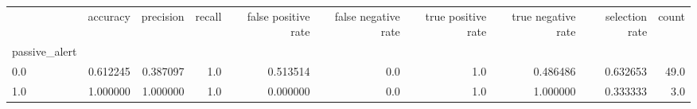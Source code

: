 \begin{tabular}{lrrrrrrrrr}
\toprule
{} &  accuracy &  precision &  recall &  false positive rate &  false negative rate &  true positive rate &  true negative rate &  selection rate &  count \\
passive\_alert &           &            &         &                      &                      &                     &                     &                 &        \\
\midrule
0.0           &  0.612245 &   0.387097 &     1.0 &             0.513514 &                  0.0 &                 1.0 &            0.486486 &        0.632653 &   49.0 \\
1.0           &  1.000000 &   1.000000 &     1.0 &             0.000000 &                  0.0 &                 1.0 &            1.000000 &        0.333333 &    3.0 \\
\bottomrule
\end{tabular}
